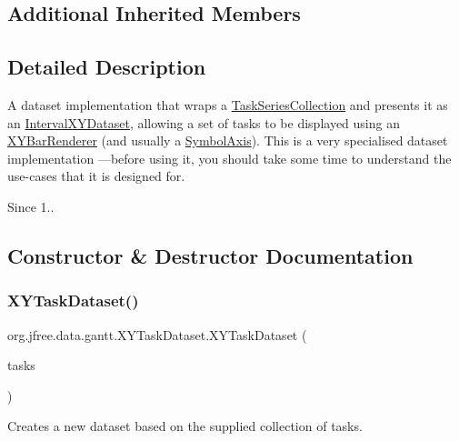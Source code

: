 \subsection*{Additional Inherited Members}


\subsection{Detailed Description}
A dataset implementation that wraps a \mbox{\hyperlink{classorg_1_1jfree_1_1data_1_1gantt_1_1_task_series_collection}{Task\+Series\+Collection}} and presents it as an \mbox{\hyperlink{}{Interval\+X\+Y\+Dataset}}, allowing a set of tasks to be displayed using an \mbox{\hyperlink{}{X\+Y\+Bar\+Renderer}} (and usually a \mbox{\hyperlink{}{Symbol\+Axis}}). This is a very specialised dataset implementation ---before using it, you should take some time to understand the use-\/cases that it is designed for.

\begin{DoxySince}{Since}
1.. 
\end{DoxySince}


\subsection{Constructor \& Destructor Documentation}
\mbox{\label{classorg_1_1jfree_1_1data_1_1gantt_1_1_x_y_task_dataset_abba26f27048d164e2cd340c8cd0b82c0}} 
\subsubsection{\texorpdfstring{X\+Y\+Task\+Dataset()}{XYTaskDataset()}}
{\footnotesize\ttfamily org.\+jfree.\+data.\+gantt.\+X\+Y\+Task\+Dataset.\+X\+Y\+Task\+Dataset (\begin{DoxyParamCaption}\item[{\mbox{\hyperlink{classorg_1_1jfree_1_1data_1_1gantt_1_1_task_series_collection}{Task\+Series\+Collection}}}]{tasks }\end{DoxyParamCaption})}

Creates a new dataset based on the supplied collection of tasks.


